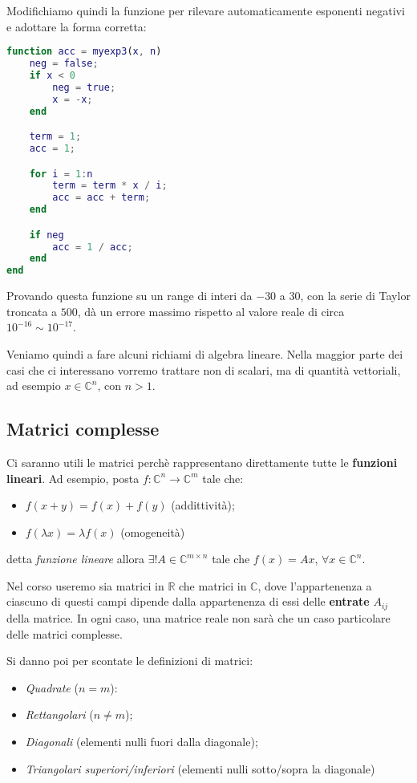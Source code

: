 \documentclass[a4paper,11pt]{article}
\begin{document}
Modifichiamo quindi la funzione per rilevare automaticamente esponenti negativi e adottare la forma corretta:

\begin{lstlisting}[language=matlab, style=codestyle]	
function acc = myexp3(x, n)
    neg = false;
    if x < 0
        neg = true;
        x = -x;
    end

    term = 1;
    acc = 1;

    for i = 1:n
        term = term * x / i;
        acc = acc + term;
    end

    if neg
        acc = 1 / acc;
    end
end
\end{lstlisting}

Provando questa funzione su un range di interi da $-30$ a $30$, con la serie di Taylor troncata a $500$, dà un errore massimo rispetto al valore reale di circa $10^{-16} \sim 10^{-17}$.

\par\bigskip

Veniamo quindi a fare alcuni richiami di algebra lineare.
Nella maggior parte dei casi che ci interessano vorremo trattare non di scalari, ma di quantità vettoriali, ad esempio $x \in \mathbb{C}^n$, con $n > 1$.

\subsection{Matrici complesse}
Ci saranno utili le matrici perchè rappresentano direttamente tutte le \textbf{funzioni lineari}. 
Ad esempio, posta $f: \mathbb{C}^n \rightarrow \mathbb{C}^m$ tale che:
\begin{itemize}
	\item $ f(x + y) = f(x) + f(y) $ (addittività);
	\item $f(\lambda x) = \lambda f(x)$ (omogeneità)
\end{itemize}
detta \textit{funzione lineare} allora $\exists ! A \in \mathbb{C}^{m \times n}$ tale che $f(x) = A x$,  $\forall x \in \mathbb{C}^n$.

Nel corso useremo sia matrici in $\mathbb{R}$ che matrici in $\mathbb{C}$, dove l'appartenenza a ciascuno di questi campi dipende dalla appartenenza di essi delle \textbf{entrate} $A_{ij}$ della matrice.
In ogni caso, una matrice reale non sarà che un caso particolare delle matrici complesse.

Si danno poi per scontate le definizioni di matrici:
\begin{itemize}
	\item \textit{Quadrate} ($n = m$):
	\item \textit{Rettangolari} ($n \neq m$);
	\item \textit{Diagonali} (elementi nulli fuori dalla diagonale);
	\item \textit{Triangolari superiori/inferiori} (elementi nulli sotto/sopra la diagonale) 
\end{itemize}
\end{document}
